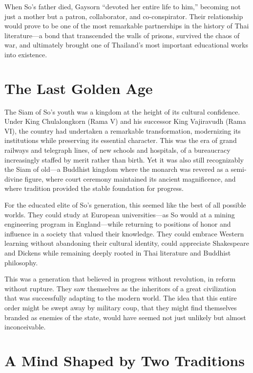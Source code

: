 \documentclass[
  Letterpaper,
]{scrbook}
\begin{document}
When So's father died, Gaysorn ``devoted her entire life to him,''
becoming not just a mother but a patron, collaborator, and
co-conspirator. Their relationship would prove to be one of the most
remarkable partnerships in the history of Thai literature---a bond that
transcended the walls of prisons, survived the chaos of war, and
ultimately brought one of Thailand's most important educational works
into existence.

\section{The Last Golden Age}\label{the-last-golden-age}

The Siam of So's youth was a kingdom at the height of its cultural
confidence. Under King Chulalongkorn (Rama V) and his successor King
Vajiravudh (Rama VI), the country had undertaken a remarkable
transformation, modernizing its institutions while preserving its
essential character. This was the era of grand railways and telegraph
lines, of new schools and hospitals, of a bureaucracy increasingly
staffed by merit rather than birth. Yet it was also still recognizably
the Siam of old---a Buddhist kingdom where the monarch was revered as a
semi-divine figure, where court ceremony maintained its ancient
magnificence, and where tradition provided the stable foundation for
progress.

For the educated elite of So's generation, this seemed like the best of
all possible worlds. They could study at European universities---as So
would at a mining engineering program in England---while returning to
positions of honor and influence in a society that valued their
knowledge. They could embrace Western learning without abandoning their
cultural identity, could appreciate Shakespeare and Dickens while
remaining deeply rooted in Thai literature and Buddhist philosophy.

This was a generation that believed in progress without revolution, in
reform without rupture. They saw themselves as the inheritors of a great
civilization that was successfully adapting to the modern world. The
idea that this entire order might be swept away by military coup, that
they might find themselves branded as enemies of the state, would have
seemed not just unlikely but almost inconceivable.

\section{A Mind Shaped by Two
Traditions}\label{a-mind-shaped-by-two-traditions}
\end{document}
